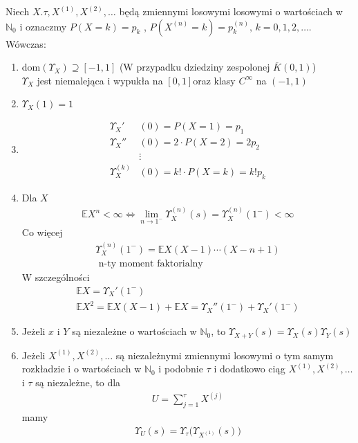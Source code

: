 \begin{twr}
Niech $ X.\tau,X^{(1)},X^{(2)},\dots $ będą zmiennymi losowymi losowymi o wartościach w $ \mathbb N _0 $ i oznaczmy $ P\left(X=k\right)=p_k $ , $ P\left(X^(n)=k\right)=p_k^{(n)} ,\,k=0,1,2,\dots$. Wówczas:
\begin{enumerate}
\item dom$ \left(\Upsilon_X\right) \supseteq[-1,1]$
(W przypadku dziedziny zespolonej $ \overline K(0,1) $)\\
$ \Upsilon_X $ jest niemalejąca i wypukła na $ [0,1] $oraz klasy $ C^\infty  $ na $ (-1,1) $
\item $ \Upsilon_X(1)=1 $
\item \begin{align*}
\Upsilon_X'&(0)= P\left(X=1\right)=p_1        \\
\Upsilon_X''&(0)=2\cdot P\left(X=2\right)=2p_2\\
&\vdots                                       \\
\Upsilon_X^{(k)}&(0)=k!\cdot P\left(X=k\right)=k!p_k
\end{align*}
\item Dla $ X $
\begin{gather*}
\mathbb E X^n<\infty 
\Leftrightarrow
\lim\limits_{n\to1^-} \Upsilon_X^{(n)}(s)
=
\Upsilon_X^{(n)}(1^-)<\infty 
\end{gather*}
Co więcej
\begin{gather*}
\Upsilon_X^{(n)}(1^-)
=
\mathbb E X(X-1)\cdots(X-n+1)\\
\text{  n-ty moment faktorialny}
\end{gather*}
W szczególności
\begin{gather*}
\mathbb E X
=
\Upsilon_X'(1^-)\\
\mathbb E X^2
=
\mathbb E X(X-1)+\mathbb E X
=
\Upsilon_X''(1^-)+\Upsilon_X'(1^-)
\end{gather*}
\item Jeżeli $ x $ i $ Y $ są niezależne o wartościach w $ \mathbb N _0 $, to $ \Upsilon_{X+Y}(s)=\Upsilon_X(s)\Upsilon_Y(s) $
\item Jeżeli $ X^{(1)},X^{(2)},\dots $ są niezależnymi zmiennymi losowymi o tym samym rozkładzie i o wartościach w $ \mathbb N _0 $ i podobnie $ \tau $ i dodatkowo ciąg $ X^{(1)},X^{(2)},\dots $ i $ \tau $ są niezależne, to dla 
\begin{gather*}
U=\sum_{j=1}^{\tau}X^{(j)}
\end{gather*}
mamy
\begin{gather*}
\Upsilon_U(s)=\Upsilon_\tau \bigl(\Upsilon_{X^{(1)}}(s)\bigr)

\end{gather*}
\end{enumerate}
\end{twr}
